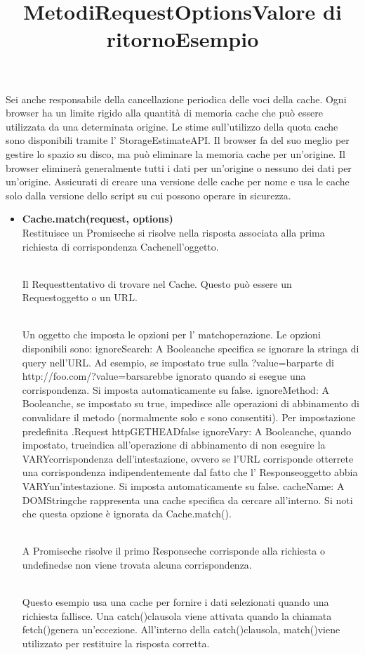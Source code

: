 \documentclass[italian]{article}
\begin{document}
Sei anche responsabile della cancellazione periodica delle voci della cache. Ogni browser ha un limite rigido alla quantità di memoria cache che può essere utilizzata da una determinata origine. Le stime sull'utilizzo della quota cache sono disponibili tramite l' StorageEstimateAPI. Il browser fa del suo meglio per gestire lo spazio su disco, ma può eliminare la memoria cache per un'origine. Il browser eliminerà generalmente tutti i dati per un'origine o nessuno dei dati per un'origine. Assicurati di creare una versione delle cache per nome e usa le cache solo dalla versione dello script su cui possono operare in sicurezza.
\title{\textbf{Metodi}}
\begin{itemize}
	\item \textbf{Cache.match(request, options)}\\
	Restituisce un Promiseche si risolve nella risposta associata alla prima richiesta di corrispondenza Cachenell'oggetto.\\
	\title{\textbf{Request}}\\
	Il Requesttentativo di trovare nel Cache. Questo può essere un   Requestoggetto o un URL.\\
	\title{\textbf{Options}}\\
	Un oggetto che imposta le opzioni per l' matchoperazione. Le opzioni disponibili sono:
	ignoreSearch: A Booleanche specifica se ignorare la stringa di query nell'URL. Ad esempio, se impostato true sulla  ?value=barparte di http://foo.com/?value=barsarebbe ignorato quando si esegue una corrispondenza. Si imposta automaticamente su false.
	ignoreMethod: A Booleanche, se impostato su true, impedisce alle operazioni di abbinamento di convalidare il metodo (normalmente solo e sono consentiti). Per impostazione predefinita .Request httpGETHEADfalse
	ignoreVary: A Booleanche, quando impostato, trueindica all'operazione di abbinamento di non eseguire la VARYcorrispondenza dell'intestazione, ovvero se l'URL corrisponde otterrete una corrispondenza indipendentemente dal fatto che l' Responseoggetto abbia VARYun'intestazione. Si imposta automaticamente su false.
	cacheName: A DOMStringche rappresenta una cache specifica da cercare all'interno. Si noti che questa opzione è ignorata da Cache.match().\\
	\title{\textbf{Valore di ritorno}}\\
	A Promiseche risolve il primo Responseche corrisponde alla richiesta o undefinedse non viene trovata alcuna corrispondenza.\\
	\title{\textbf{Esempio}}\\
	Questo esempio usa una cache per fornire i dati selezionati quando una richiesta fallisce. Una catch()clausola viene attivata quando la chiamata fetch()genera un'eccezione. All'interno della catch()clausola,  match()viene utilizzato per restituire la risposta corretta.
	

\end{itemize}
\end{document}
